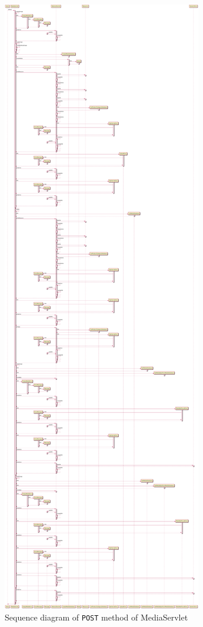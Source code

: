 \begin{figure}[H]
    \centering
    \includegraphics[width=\textwidth,height=0.95\textheight,keepaspectratio]{Schemas/MediaServlet_doPost.svg.pdf}
    \caption{Sequence diagram of \texttt{POST} method of MediaServlet}
    \label{fig:MediaServlet_doPost}
\end{figure}
